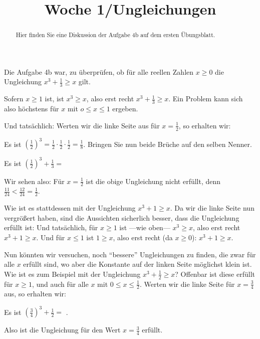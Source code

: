 \documentclass{ximera}
\title{Woche 1/Ungleichungen}
\begin{document}
\begin{abstract}
Hier finden Sie eine Diskussion der Aufgabe 4b auf dem ersten Übungsblatt.
\end{abstract}
\maketitle


Die Aufgabe 4b war, zu überprüfen, ob für alle reellen Zahlen $x\ge 0$ die Ungleichung $x^3 + \frac 13 \ge x$ gilt.

Sofern $x\ge 1$ ist, ist $x^3 \ge x$, also erst recht $x^3 + \frac 13 \ge x$. Ein Problem kann sich also höchstens für $x$ mit $o\le x\le 1$ ergeben.

\begin{question}
Und tatsächlich: Werten wir die linke Seite aus für $x = \frac 12$, so erhalten wir:
\begin{solution}
\begin{hint}
Es ist $\left(\frac 12\right)^3 = \frac 12 \cdot \frac 12\cdot \frac 12 = \frac 18$. Bringen Sie nun beide Brüche auf den selben Nenner.
\end{hint}
Es ist $\left(\frac 12\right)^3 + \frac 13=$ 
\end{solution}
\begin{solution}
Wir sehen also: Für $x= \frac 12$ ist die obige Ungleichung nicht erfüllt, denn $\frac{11}{24}< \frac{12}{24} = \frac 12$.
\end{solution}
\end{question}


Wie ist es stattdessen mit der Ungleichung $x^3 + 1 \ge x$. Da wir die linke Seite nun vergrößert haben, sind die Aussichten sicherlich besser, dass die Ungleichung erfüllt ist: Und tatsächlich, für $x\ge 1$ ist ---wie oben--- $x^3\ge x$, also erst recht $x^3+1\ge x$. Und für $x\le 1$ ist $1\ge x$, also erst recht (da $x\ge 0$): $x^3+1\ge x$.

\begin{question}
Nun könnten wir versuchen, noch ``bessere'' Ungleichungen zu finden, die zwar für alle $x$ erfüllt sind, wo aber die Konstante auf der linken Seite möglichst klein ist. Wie ist es zum Beispiel mit der Ungleichung $x^3 + \frac 12 \ge x$? Offenbar ist diese erfüllt für $x\ge 1$, und auch für alle $x$ mit $0\le x\le \frac 12$. Werten wir die linke Seite für $x=\frac 34$ aus, so erhalten wir:
\begin{solution}
Es ist $\left(\frac 34\right)^3 + \frac 12 =$ .
\end{solution}
\begin{solution}
Also ist die Ungleichung für den Wert $x = \frac 34$ erfüllt.
\end{solution}
\end{question}
\end{document}
